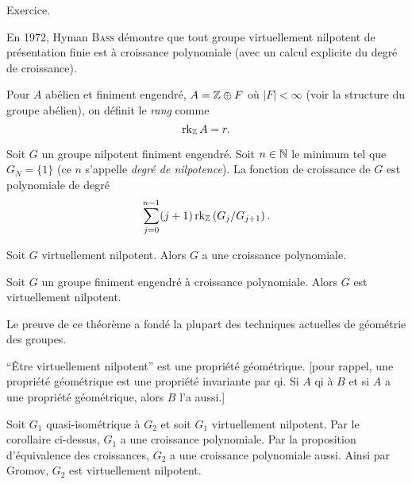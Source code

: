     \begin{preuve}
      Exercice.
    \end{preuve}

    
    En 1972, Hyman \textsc{Bass} démontre que tout groupe virtuellement nilpotent de présentation finie est à
    croissance polynomiale (avec un calcul explicite du degré de croissance).

    \begin{defi}  
      Pour $A$ abélien et finiment engendré, $A = \mathbb{Z} \oplus F$ où $|F| < \infty$ (voir
      la structure du groupe abélien), on définit le \emph{rang} comme 
        \[\operatorname{rk}_{\mathbb{Z}} A = r.\]
    \end{defi}


    \begin{theo}  
      Soit $G$ un groupe nilpotent finiment engendré. Soit $n \in \mathbb{N}$ le minimum tel que $G_N = \{1\}$ (ce $n$
      s'appelle \emph{degré de nilpotence}). La fonction de croissance de $G$ est polynomiale de degré
        \[\sum_{j=0}^{n-1}(j+1)\operatorname{rk}_{\mathbb{Z}}\left(G_j/G_{j+1}\right).\]
    \end{theo}

    \begin{cor}
      Soit $G$ virtuellement nilpotent. Alors $G$ a une croissance polynomiale.
    \end{cor}

    \begin{theo} 
      Soit $G$ un groupe finiment engendré à croissance polynomiale. Alors $G$ est virtuellement nilpotent.
    \end{theo}

    Le preuve de ce théorème a fondé la plupart des techniques actuelles de géométrie des groupes.

    \begin{cor}
      ``Être virtuellement nilpotent'' est une propriété géométrique. {\normalfont \small[pour rappel, une propriété
        géométrique est une propriété invariante par qi. Si $A$ qi à $B$ et si $A$ a une propriété
        géométrique, alors $B$ l'a aussi.]}
    \end{cor}

    \begin{preuve}
      Soit $G_1$ quasi-isométrique à $G_2$ et soit $G_1$ virtuellement nilpotent. Par le corollaire ci-dessus,
      $G_1$ a une croissance polynomiale. Par la proposition d'équivalence des croissances, $G_2$ a une
      croissance polynomiale aussi. Ainsi par Gromov, $G_2$ est virtuellement nilpotent.
    \end{preuve}


